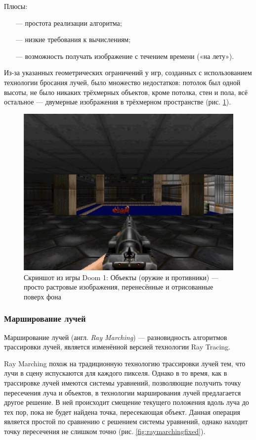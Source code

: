 Плюсы:
\begin{itemize}[leftmargin=1.6\parindent]
	\item[---] простота реализации алгоритма;
	\item[---] низкие требования к вычислениям;
	\item[---] возможность получать изображение с течением времени («на лету»).
\end{itemize}

Из-за указанных геометрических ограничений у игр, созданных с 
использованием технологии бросания лучей, было множество недостатков: 
потолок был одной высоты, не было никаких трёхмерных объектов, кроме 
потолка, стен и пола, всё остальное — двумерные изображения в трёхмерном 
пространстве (рис. \ref{fig:doom}).

\begin{figure}[h]
	\centering
	\captionsetup{justification=centering}
	\includegraphics[width=120mm]{img/doom.png}
	\caption{Скриншот из игры Doom 1: Объекты (оружие и противники) --- 
		просто растровые изображения, перенесённые и отрисованные поверх фона}
	\label{fig:doom}
\end{figure}


\subsubsection{Марширование лучей}
Марширование лучей (англ. \textit{Ray Marching}) \cite{raymarching} --- разновидность алгоритмов 
трассировки лучей, является изменённой версией технологии Ray Tracing.

Ray Marching похож на традиционную технологию трассировки лучей 
тем, что лучи в сцену испускаются для каждого пикселя.
Однако в то время, как 
в трассировке лучей имеются системы уравнений, позволяющие получить 
точку пересечения луча и объектов, в технологии марширования лучей 
предлагается другое решение.
В ней происходит смещение текущего положения вдоль луча до тех пор, пока не будет найдена точка, пересекающая 
объект.
Данная операция является простой по сравнению с решением системы 
уравнений, однако находит точку пересечения не слишком точно (рис. \ref{fig:raymarchingfixed}).
\clearpage

